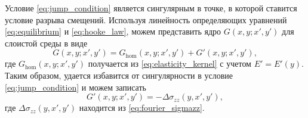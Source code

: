Условие \eqref{eq:jump_condition} является сингулярным в точке, в которой ставится условие разрыва смещений. Используя линейность определяющих уравнений \eqref{eq:equilibrium} и \eqref{eq:hooke_law}, можем представить ядро $G(x,y;x',y')$ для слоистой среды в виде
\begin{equation}
    G(x,y;x',y') = G_\text{hom}(x,y;x',y') + G'(x,y;x',y'),
\end{equation} 
где $G_\text{hom}(x,y;x',y')$ получается из \eqref{eq:elasticity_kernel} с учетом $E'=E'(y)$. Таким образом, удается избавится от сингулярности в условие \eqref{eq:jump_condition} и можем записать
\begin{equation}
    \label{eq:heterogeneous_kernel}
    G'(x,y;x',y') = -\Delta \sigma_{zz}(y, x', y'),
\end{equation}
где $\Delta \sigma_{zz}(y, x', y')$ находится из \eqref{eq:fourier_sigmazz}.
